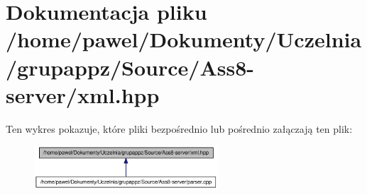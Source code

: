 \hypertarget{a00018}{
\section{Dokumentacja pliku /home/pawel/Dokumenty/Uczelnia/grupappz/Source/Ass8-server/xml.hpp}
\label{d1/d2b/a00018}
}


Ten wykres pokazuje, które pliki bezpośrednio lub pośrednio załączają ten plik:\nopagebreak
\begin{figure}[H]
\begin{center}
\leavevmode
\includegraphics[width=194pt]{d2/d79/a00051}
\end{center}
\end{figure}
